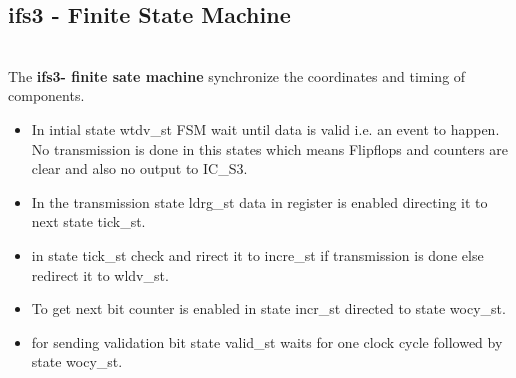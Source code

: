 \documentclass[12pt,a4 paper] {report}
\begin{document}
\newpage

\subsection*{ifs3 - Finite State Machine}
\\
The \textbf{ifs3- finite sate machine} synchronize the coordinates and timing of components. \\
\begin{itemize}	
	
	\item In intial state wtdv\_st FSM wait until data is valid  i.e. an event to happen. No transmission is done in this states which means Flipflops and counters are clear and also no output to IC\_S3.\\
	
	\item In the transmission state ldrg\_st data in register is enabled directing it to next state tick\_st. \\
	
	\item in state tick\_st check and rirect it to incre\_st if transmission is done else redirect it to wldv\_st.\\
	
	\item To get next bit counter is enabled in state incr\_st directed to state wocy\_st.\\
	
	\item  for sending validation bit state valid\_st waits for one clock cycle followed by state wocy\_st. \\
	
\end{itemize}
\end{document}
